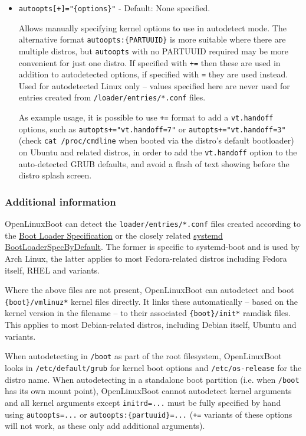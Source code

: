 \documentclass[]{article}
\begin{document}
\begin{itemize}
	\item \texttt{autoopts[+]="\{options\}"} - Default: None specified. \medskip
  
  Allows manually specifying kernel options to use in autodetect mode. The alternative format \texttt{autoopts:\{PARTUUID\}}
  is more suitable where there are multiple distros, but \texttt{autoopts} with no PARTUUID required may be more
  convenient for just one distro.
  If specified with \texttt{+=} then these are used in addition to autodetected options, if specified
  with \texttt{=} they are used instead. Used for autodetected Linux only -- values specified here are never
  used for entries created from \texttt{/loader/entries/*.conf} files.
  \medskip

  As example usage, it is possible to use \texttt{+=} format to add
  a \texttt{vt.handoff} options, such as \texttt{autopts+="vt.handoff=7"} or \texttt{autopts+="vt.handoff=3"}
  (check \texttt{cat /proc/cmdline} when booted via the distro's default bootloader) on Ubuntu and related distros,
  in order to add the \texttt{vt.handoff} option to the auto-detected GRUB defaults, and avoid a flash of text
  showing before the distro splash screen.
  \medskip
\end{itemize}

\subsubsection{Additional information}

OpenLinuxBoot can detect the \texttt{loader/entries/*.conf} files created according to the
\href{https://systemd.io/BOOT_LOADER_SPECIFICATION/}{Boot Loader Specification} or the closely related
\href{https://fedoraproject.org/wiki/Changes/BootLoaderSpecByDefault}{systemd BootLoaderSpecByDefault}. The
former is specific to systemd-boot and is used by Arch Linux, the latter applies to most Fedora-related distros
including Fedora itself, RHEL and variants.

Where the above files are not present, OpenLinuxBoot can autodetect and
boot \texttt{\{boot\}/vmlinuz*} kernel files directly. It links these automatically -- based on the
kernel version in the filename -- to their associated \texttt{\{boot\}/init*} ramdisk files.
This applies to most Debian-related distros, including Debian itself, Ubuntu and variants.

When autodetecting in \texttt{/boot} as part of the root filesystem, OpenLinuxBoot looks in \texttt{/etc/default/grub}
for kernel boot options and \texttt{/etc/os-release} for the distro name. When autodetecting in a standalone boot
partition (i.e. when \texttt{/boot} has its own mount point), OpenLinuxBoot cannot autodetect kernel arguments and
all kernel arguments except \texttt{initrd=...} must be fully specified by hand using \texttt{autoopts=...} or
\texttt{autoopts:\{partuuid\}=...} (\texttt{+=} variants of these options will not work, as these only add additional
arguments).
\end{document}
